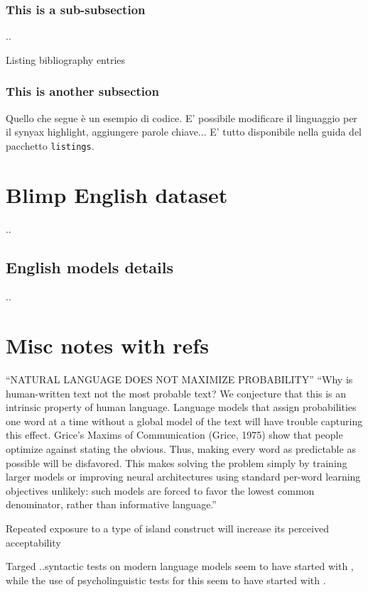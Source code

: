 \subsubsection{This is a sub-subsection}
..



Listing bibliography entries \citep{wei2021frequency, hu2020systematic, lau2020furiously,  sprouse2016experimental}

\subsubsection{This is another subsection}

Quello che segue è un esempio di codice. E' possibile modificare il linguaggio per il synyax highlight, aggiungere parole chiave... E' tutto disponibile nella guida del pacchetto \texttt{listings}.

 

\section{Blimp English dataset}
..
\subsection{English models details}
..

\section{Misc notes with refs}

“NATURAL LANGUAGE DOES NOT MAXIMIZE PROBABILITY” 
“Why is human-written text not the most probable text? We conjecture that this is an intrinsic property of human language. Language models that assign probabilities one word at a time without a global model of the text will have trouble capturing this effect. Grice’s Maxims of Communication (Grice, 1975) show that people optimize against stating the obvious. Thus, making every word as predictable as possible will be disfavored. This makes solving the problem simply by training larger models or improving neural architectures using standard per-word learning objectives unlikely: such models are forced to favor the lowest common denominator, rather than informative language.” 
\citep{holtzman2019curious}

Repeated exposure to a type of island construct will increase its perceived acceptability 
\citep{chaves2014subject}

Targed ..syntactic tests on modern language models seem to have started with \citet{linzen2016assessing}, while the use of psycholinguistic tests for this seem to have started with \citet{futrell2018rnns}.
